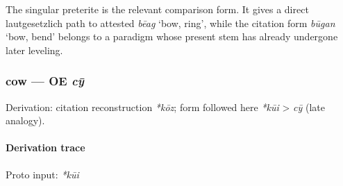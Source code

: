\documentclass[
  british,
  a4paper,
]{article}
\begin{document}
The singular preterite is the relevant comparison form. It gives a
direct lautgesetzlich path to attested {\emph{bēag}} `bow, ring', while
the citation form {\emph{būgan}} `bow, bend' belongs to a paradigm whose
present stem has already undergone later leveling.

\subsubsection{\texorpdfstring{cow --- OE
\emph{cȳ}}{cow --- OE cȳ}}\label{cow-oe-cux233}

Derivation: citation reconstruction \emph{*kōz}; form followed here
\emph{*kūi} \textgreater{} \emph{cȳ} (late analogy).

\paragraph{Derivation trace}\label{derivation-trace-151}

Proto input: \emph{*kūi}

\begingroup
\setlength{\fboxsep}{6pt}

\noindent{} \endgroup
\end{document}
